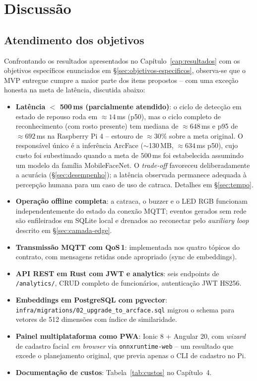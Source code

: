 \documentclass[12pt,a4paper]{report}
\begin{document}
\chapter{Discussão}

\section{Atendimento dos objetivos}

Confrontando os resultados apresentados no Capítulo~\ref{cap:resultados}
com os objetivos específicos enunciados em §\ref{sec:objetivos-especificos},
observa-se que o MVP entregue cumpre a maior parte dos itens propostos
-- com uma exceção honesta na meta de latência, discutida abaixo:

\begin{itemize}
    \item \textbf{Latência $<$ 500\,ms (parcialmente atendido)}: o
        ciclo de detecção em estado de repouso roda em
        $\approx 14\,$ms (p50), mas o ciclo completo de
        reconhecimento (com rosto presente) tem mediana de
        $\approx 648\,$ms e p95 de $\approx 692\,$ms na Raspberry
        Pi 4 -- estouro de $\approx 30\%$ sobre a meta original. O
        responsável único é a inferência ArcFace ($\sim$130\,MB,
        $\approx 634\,$ms p50), cujo custo foi subestimado quando a
        meta de $500\,$ms foi estabelecida assumindo um modelo da
        família MobileFaceNet. O \textit{trade-off} favoreceu
        deliberadamente a acurácia (§\ref{sec:desempenho}); a
        latência observada permanece adequada à percepção humana
        para um caso de uso de catraca. Detalhes em
        §\ref{sec:tempo}.
    \item \textbf{Operação offline completa}: a catraca, o buzzer e o
        LED RGB funcionam independentemente do estado da conexão
        MQTT; eventos gerados sem rede são enfileirados em SQLite
        local e drenados ao reconectar pelo \textit{auxiliary loop}
        descrito em §\ref{sec:camada-edge}.
    \item \textbf{Transmissão MQTT com QoS\,1}: implementada nos quatro
        tópicos do contrato, com mensagens retidas onde apropriado
        (sync de embeddings).
    \item \textbf{API REST em Rust com JWT e analytics}: seis
        endpoints de \texttt{/analytics/}, CRUD completo de
        funcionários, autenticação JWT HS256.
    \item \textbf{Embeddings em PostgreSQL com pgvector}:
        \texttt{infra/migrations/02\_upgrade\_to\_arcface.sql} migrou
        o schema para vetores de 512 dimensões com índice de
        similaridade.
    \item \textbf{Painel multiplataforma como PWA}: Ionic 8 + Angular
        20, com \textit{wizard} de cadastro facial \emph{em browser}
        via \texttt{onnxruntime-web} -- um resultado que excede o
        planejamento original, que previa apenas o CLI de cadastro
        no Pi.
    \item \textbf{Documentação de custos}: Tabela~\ref{tab:custos}
        no Capítulo~4.
\end{itemize}
\end{document}
